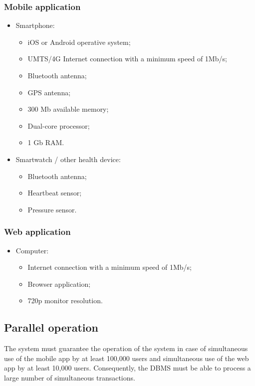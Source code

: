 \subsubsection{Mobile application}
\begin{itemize}
  \item Smartphone:
  \begin{itemize}
    \item iOS or Android operative system;
    \item UMTS/4G Internet connection with a minimum speed of 1Mb/s;
    \item Bluetooth antenna;
    \item GPS antenna;
    \item 300 Mb available memory;
    \item Dual-core processor;
    \item 1 Gb RAM.
  \end{itemize}
  \item Smartwatch / other health device:
  \begin{itemize}
    \item Bluetooth antenna;
    \item Heartbeat sensor;
    \item Pressure sensor.
  \end{itemize}
\end{itemize}

\subsubsection{Web application}
\begin{itemize}
  \item Computer:
  \begin{itemize}
    \item Internet connection with a minimum speed of 1Mb/s;
    \item Browser application;
    \item 720p monitor resolution.
  \end{itemize}
\end{itemize}

\subsection{Parallel operation}
The system must guarantee the operation of the system in case of simultaneous use of the mobile app by at least 100,000 users and simultaneous use of the web app by at least 10,000 users.
Consequently, the DBMS must be able to process a large number of simultaneous transactions.

